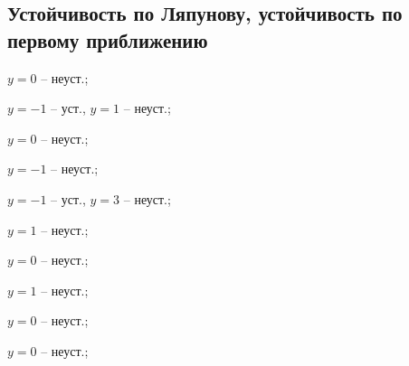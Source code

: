 \subsection*{Устойчивость по Ляпунову, устойчивость по первому приближению}

	\begin{enumsols}

		\item \( y = 0 \) -- неуст.; %
		\item \( y = -1 \) -- уст., \( y = 1 \) -- неуст.; %
		\item \( y = 0 \) -- неуст.; %
		\item \( y = -1 \) -- неуст.; %
		\item \( y = -1 \) -- уст., \( y = 3 \) -- неуст.; %
		\item \( y = 1 \) -- неуст.;  %
		\item \( y = 0 \) -- неуст.; %
		\item \( y = 1 \) -- неуст.; %
		\item \( y = 0 \) -- неуст.; %
		\item \( y = 0 \) -- неуст.; %
		

\end{enumsols}
